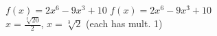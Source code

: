 {$f(x) = 2x^6-9x^3+10$}
{$f(x) = 2x^6-9x^3+10$ \\ $x =\frac{\sqrt[3]{20}}{2} $, $x = \sqrt[3]{2}$ (each has mult. 1)}